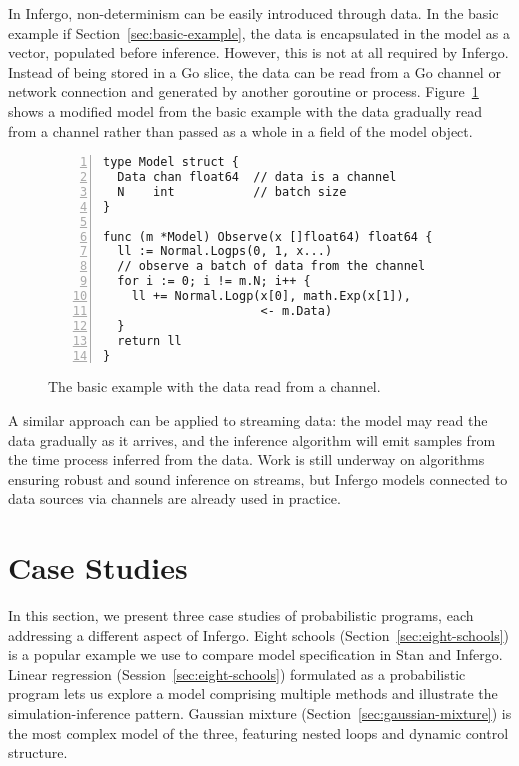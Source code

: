 \documentclass[sigplan,review,10pt,anonymous]{acmart}
\begin{document}
\begin{sloppypar}
In Infergo, non-determinism can be easily introduced through
data. In the basic example if Section~\ref{sec:basic-example},
the data is encapsulated in the model as a vector, populated
before inference. However, this is not at all required by
Infergo.  Instead of being stored in a Go slice, the data can be
read from a Go channel or network connection and generated by
another goroutine or process.
Figure~\ref{fig:basic-example-channel} shows a modified model
from the basic example with the data gradually read from a
channel rather than passed as a whole in a field of the model
object.
\begin{figure}
  \begin{lstlisting}[framexleftmargin=10pt,numbers=left]
type Model struct {
  Data chan float64  // data is a channel
  N    int           // batch size
}

func (m *Model) Observe(x []float64) float64 {
  ll := Normal.Logps(0, 1, x...)
  // observe a batch of data from the channel
  for i := 0; i != m.N; i++ {
    ll += Normal.Logp(x[0], math.Exp(x[1]),
                      <- m.Data)
  }
  return ll
}
  \end{lstlisting}
  \caption{The basic example with the data read from a channel.}
  \label{fig:basic-example-channel}
\end{figure}

A similar approach can be applied to streaming data: the model
may read the data gradually as it arrives, and the inference
algorithm will emit samples from the time process inferred from
the data. Work is still underway on algorithms ensuring robust
and sound inference on streams, but Infergo models connected to
data sources via channels are already used in practice.

\section{Case Studies}
\label{sec:case-studies}

In this section, we present three case studies of probabilistic
programs, each addressing a different aspect of Infergo. Eight
schools (Section~\ref{sec:eight-schools}) is a popular example  we
use to compare model specification in Stan and Infergo. Linear
regression (Session~\ref{sec:eight-schools}) formulated as a
probabilistic program lets us explore a model comprising
multiple methods and illustrate the simulation-inference pattern.
Gaussian mixture (Section~\ref{sec:gaussian-mixture}) is
the most complex model of the three, featuring nested loops and
dynamic control structure.


\end{sloppypar}
\end{document}
